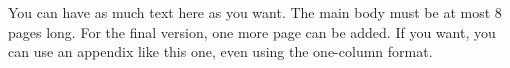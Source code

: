 \documentclass[nohyperref]{article}
\theoremstyle{plain}
\theoremstyle{definition}
\theoremstyle{remark}
\begin{document}
You can have as much text here as you want. The main body must be at most $8$ pages long.
For the final version, one more page can be added.
If you want, you can use an appendix like this one, even using the one-column format.
\end{document}
